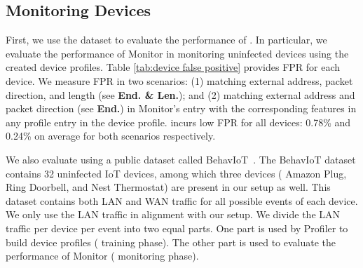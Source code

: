 \subsection{Monitoring Devices}\label{subsec:monitoring-devices}
First, we use the \system{} dataset to evaluate the performance of \system{}. In particular, we evaluate the performance of Monitor in monitoring uninfected devices using the created device profiles. 
Table \ref{tab:device false positive} provides FPR for each device. We measure FPR in two scenarios: (1) matching external address, packet direction, and length (see \textbf{End. \& Len.}); and (2) matching external address and packet direction (see \textbf{End.}) in Monitor's entry with the corresponding features in any profile entry in the device profile. \system{} incurs low FPR for all devices: 0.78\% and 0.24\% on average for both scenarios respectively.

We also evaluate \system using a public dataset called BehavIoT~\cite{hu2023behaviot}. The BehavIoT dataset contains 32 uninfected IoT devices, among which three devices (\ie{} Amazon Plug, Ring Doorbell, and Nest Thermostat) are present in our setup as well. This dataset contains both LAN and WAN traffic for all possible events of each device. We only use the LAN traffic in alignment with our setup. 
We divide the LAN traffic per device per event into two equal parts. One part is used by Profiler to build device profiles (\ie{} training phase). The other part is used to evaluate the performance of Monitor (\ie{} monitoring phase). 

